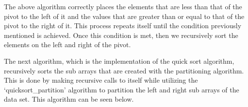 \documentclass[a4paper,9pt]{article}
\begin{document}
\begin{highlight}
    \noindent The above algorithm correctly places the elements that are less than that of the pivot to the left of it and the values that are greater than or equal to that of the pivot
    to the right of it. This process repeats itself until the condition previously mentioned is achieved. Once this condition is met, then we recursively sort the elements on the left and right of the pivot.

\end{highlight}

The next algorithm, which is the implementation of the quick sort algorithm, recursively sorts the sub arrays that are created with the partitioning algorithm. This is done
by making recursive calls to itself while utilizing the `quicksort\_partition' algorithm to partition the left and right sub arrays of the data set. This algorithm can be seen below.
\end{document}
